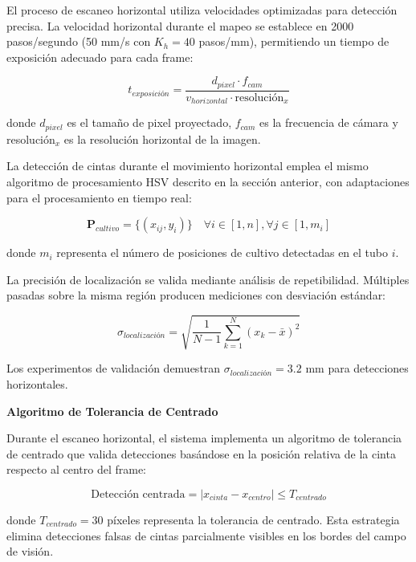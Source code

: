 El proceso de escaneo horizontal utiliza velocidades optimizadas para detección precisa. La velocidad horizontal durante el mapeo se establece en 2000 pasos/segundo (50 mm/s con $K_h = 40$ pasos/mm), permitiendo un tiempo de exposición adecuado para cada frame:

\begin{equation}
t_{exposición} = \frac{d_{pixel} \cdot f_{cam}}{v_{horizontal} \cdot \text{resolución}_x}
\end{equation}

donde $d_{pixel}$ es el tamaño de pixel proyectado, $f_{cam}$ es la frecuencia de cámara y resolución$_x$ es la resolución horizontal de la imagen.

La detección de cintas durante el movimiento horizontal emplea el mismo algoritmo de procesamiento HSV descrito en la sección anterior, con adaptaciones para el procesamiento en tiempo real:

\begin{equation}
\mathbf{P}_{cultivo} = \{(x_{ij}, y_i)\} \quad \forall i \in [1,n], \forall j \in [1,m_i]
\end{equation}

donde $m_i$ representa el número de posiciones de cultivo detectadas en el tubo $i$.

La precisión de localización se valida mediante análisis de repetibilidad. Múltiples pasadas sobre la misma región producen mediciones con desviación estándar:

\begin{equation}
\sigma_{localización} = \sqrt{\frac{1}{N-1}\sum_{k=1}^{N}(x_k - \bar{x})^2}
\end{equation}

Los experimentos de validación demuestran $\sigma_{localización} = 3.2$ mm para detecciones horizontales.

\textbf{Algoritmo de Tolerancia de Centrado}

Durante el escaneo horizontal, el sistema implementa un algoritmo de tolerancia de centrado que valida detecciones basándose en la posición relativa de la cinta respecto al centro del frame:

\begin{equation}
\text{Detección centrada} = |x_{cinta} - x_{centro}| \leq T_{centrado}
\end{equation}

donde $T_{centrado} = 30$ píxeles representa la tolerancia de centrado. Esta estrategia elimina detecciones falsas de cintas parcialmente visibles en los bordes del campo de visión.

